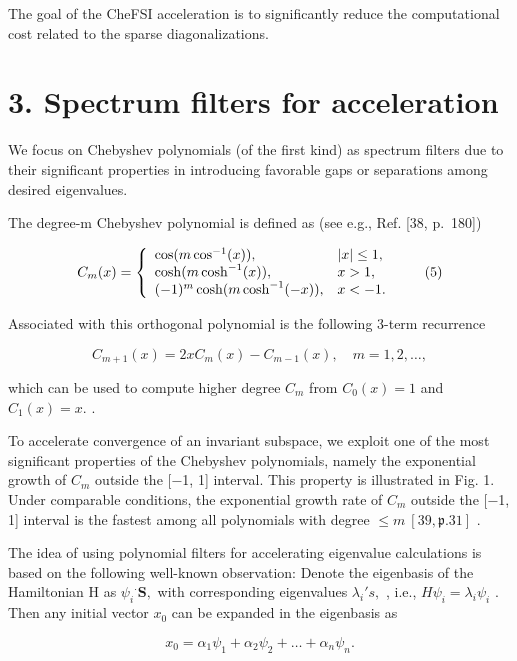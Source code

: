 \documentclass[
  10
]{article}
\begin{document}
The goal of the CheFSI acceleration is to significantly reduce the
computational cost related to the sparse diagonalizations.

\section{3. Spectrum filters for
acceleration}\label{spectrum-filters-for-acceleration}

We focus on Chebyshev polynomials (of the first kind) as spectrum
filters due to their significant properties in introducing favorable
gaps or separations among desired eigenvalues.

The degree-m Chebyshev polynomial is defined as (see e.g., Ref. {[}38,
p.~180{]})

\[
C _ {m} (x) = \left\{ \begin{array}{l l} \cos (m \cos^ {- 1} (x)), & | x | \leq 1, \\ \cosh (m \cosh^ {- 1} (x)), & x > 1, \\ (- 1) ^ {m} \cosh (m \cosh^ {- 1} (- x)), & x <   - 1. \end{array} \right. \tag {5}
\]

Associated with this orthogonal polynomial is the following 3-term
recurrence

\[
C _ {m + 1} (x) = 2 x C _ {m} (x) - C _ {m - 1} (x), \quad m = 1, 2, \dots , \tag {6}
\]

which can be used to compute higher degree \(C _ { m }\) from
\(C _ { 0 } ( x ) = 1\) and \(C _ { 1 } ( x ) = x .\) .

To accelerate convergence of an invariant subspace, we exploit one of
the most significant properties of the Chebyshev polynomials, namely the
exponential growth of \(C _ { m }\) outside the {[}−1, 1{]} interval.
This property is illustrated in Fig. 1. Under comparable conditions, the
exponential growth rate of \(C _ { m }\) outside the {[}−1, 1{]}
interval is the fastest among all polynomials with degree
\(\leq m \ [ 3 9 , { \mathfrak { p } } . 3 1 ]\) .

The idea of using polynomial filters for accelerating eigenvalue
calculations is based on the following well-known observation: Denote
the eigenbasis of the Hamiltonian H as
\(\psi _ { i } \mathrm { } ^ { \cdot } \mathbf { S } ,\) with
corresponding eigenvalues \(\lambda _ { i } { ' } s ,\) , i.e.,
\(H \psi _ { i } = \lambda _ { i } \psi _ { i }\) . Then any initial
vector \(x _ { 0 }\) can be expanded in the eigenbasis as

\[
x _ {0} = \alpha_ {1} \psi_ {1} + \alpha_ {2} \psi_ {2} + \dots + \alpha_ {n} \psi_ {n}.
\]
\end{document}
